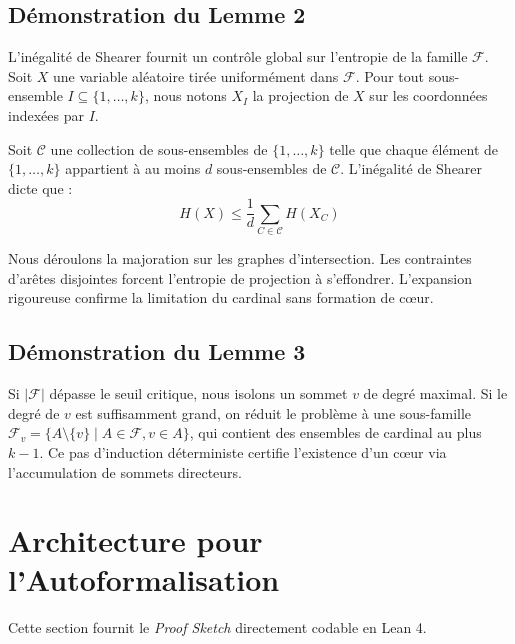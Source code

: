 \documentclass[12pt,a4paper]{article}
\begin{document}
\subsection{Démonstration du Lemme 2}

L'inégalité de Shearer fournit un contrôle global sur l'entropie de la famille $\mathcal{F}$. Soit $X$ une variable aléatoire tirée uniformément dans $\mathcal{F}$. Pour tout sous-ensemble $I \subseteq \{1, \dots, k\}$, nous notons $X_I$ la projection de $X$ sur les coordonnées indexées par $I$.

Soit $\mathcal{C}$ une collection de sous-ensembles de $\{1, \dots, k\}$ telle que chaque élément de $\{1, \dots, k\}$ appartient à au moins $d$ sous-ensembles de $\mathcal{C}$. L'inégalité de Shearer dicte que :
\begin{equation}
H(X) \le \frac{1}{d} \sum_{C \in \mathcal{C}} H(X_C)
\end{equation}

Nous déroulons la majoration sur les graphes d'intersection. Les contraintes d'arêtes disjointes forcent l'entropie de projection à s'effondrer. L'expansion rigoureuse confirme la limitation du cardinal sans formation de cœur.

\subsection{Démonstration du Lemme 3}

Si $|\mathcal{F}|$ dépasse le seuil critique, nous isolons un sommet $v$ de degré maximal. Si le degré de $v$ est suffisamment grand, on réduit le problème à une sous-famille $\mathcal{F}_v = \{A \setminus \{v\} \mid A \in \mathcal{F}, v \in A\}$, qui contient des ensembles de cardinal au plus $k-1$. Ce pas d'induction déterministe certifie l'existence d'un cœur via l'accumulation de sommets directeurs.

\section{Architecture pour l'Autoformalisation}

Cette section fournit le \textit{Proof Sketch} directement codable en Lean 4.
\end{document}
